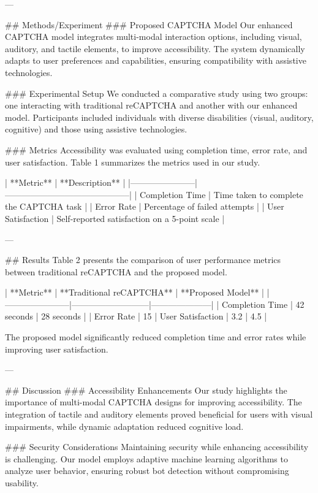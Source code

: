 ---

## Methods/Experiment  
### Proposed CAPTCHA Model  
Our enhanced CAPTCHA model integrates multi-modal interaction options, including visual, auditory, and tactile elements, to improve accessibility. The system dynamically adapts to user preferences and capabilities, ensuring compatibility with assistive technologies.  

### Experimental Setup  
We conducted a comparative study using two groups: one interacting with traditional reCAPTCHA and another with our enhanced model. Participants included individuals with diverse disabilities (visual, auditory, cognitive) and those using assistive technologies.  

### Metrics  
Accessibility was evaluated using completion time, error rate, and user satisfaction. Table 1 summarizes the metrics used in our study.  

| **Metric**           | **Description**                            |  
|-----------------------|--------------------------------------------|  
| Completion Time       | Time taken to complete the CAPTCHA task    |  
| Error Rate            | Percentage of failed attempts             |  
| User Satisfaction     | Self-reported satisfaction on a 5-point scale |  

---

## Results  
Table 2 presents the comparison of user performance metrics between traditional reCAPTCHA and the proposed model.  

| **Metric**           | **Traditional reCAPTCHA** | **Proposed Model** |  
|-----------------------|---------------------------|---------------------|  
| Completion Time       | 42 seconds               | 28 seconds          |  
| Error Rate            | 15%
| User Satisfaction     | 3.2                      | 4.5                 |  

The proposed model significantly reduced completion time and error rates while improving user satisfaction.

---

## Discussion  
### Accessibility Enhancements  
Our study highlights the importance of multi-modal CAPTCHA designs for improving accessibility. The integration of tactile and auditory elements proved beneficial for users with visual impairments, while dynamic adaptation reduced cognitive load.  

### Security Considerations  
Maintaining security while enhancing accessibility is challenging. Our model employs adaptive machine learning algorithms to analyze user behavior, ensuring robust bot detection without compromising usability.  


